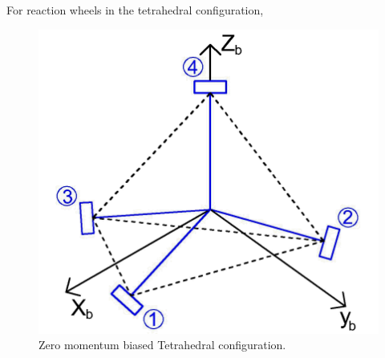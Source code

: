 \documentclass[10pt,a4paper]{report}
\begin{document}
For reaction wheels in the tetrahedral configuration, 
\begin{figure}[H]
\centering
\includegraphics[scale=0.5]{Tetconfig.png}
\caption{Zero momentum biased Tetrahedral configuration.}
\end{figure}
\end{document}

